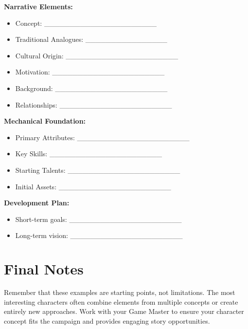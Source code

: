 \begin{tcolorbox}[colback=green!5!white,colframe=green!75!black,title=Character Concept Worksheet,fonttitle=\bfseries,breakable]
\textbf{Narrative Elements:}
\begin{itemize}
\item Concept: \_\_\_\_\_\_\_\_\_\_\_\_\_\_\_\_\_\_\_\_\_\_
\item Traditional Analogues: \_\_\_\_\_\_\_\_\_\_\_\_\_\_\_\_
\item Cultural Origin: \_\_\_\_\_\_\_\_\_\_\_\_\_\_\_\_\_\_\_\_\_\_
\item Motivation: \_\_\_\_\_\_\_\_\_\_\_\_\_\_\_\_\_\_\_\_\_\_
\item Background: \_\_\_\_\_\_\_\_\_\_\_\_\_\_\_\_\_\_\_\_\_\_
\item Relationships: \_\_\_\_\_\_\_\_\_\_\_\_\_\_\_\_\_\_\_\_\_\_
\end{itemize}

\textbf{Mechanical Foundation:}
\begin{itemize}
\item Primary Attributes: \_\_\_\_\_\_\_\_\_\_\_\_\_\_\_\_\_\_\_\_\_\_
\item Key Skills: \_\_\_\_\_\_\_\_\_\_\_\_\_\_\_\_\_\_\_\_\_\_
\item Starting Talents: \_\_\_\_\_\_\_\_\_\_\_\_\_\_\_\_\_\_\_\_\_\_
\item Initial Assets: \_\_\_\_\_\_\_\_\_\_\_\_\_\_\_\_\_\_\_\_\_\_
\end{itemize}

\textbf{Development Plan:}
\begin{itemize}
\item Short-term goals: \_\_\_\_\_\_\_\_\_\_\_\_\_\_\_\_\_\_\_\_\_\_
\item Long-term vision: \_\_\_\_\_\_\_\_\_\_\_\_\_\_\_\_\_\_\_\_\_\_
\end{itemize}
\end{tcolorbox}

\section{Final Notes}
\label{sec:concepts-final}

Remember that these examples are starting points, not limitations. The most interesting characters often combine elements from multiple concepts or create entirely new approaches. Work with your Game Master to ensure your character concept fits the campaign and provides engaging story opportunities.

